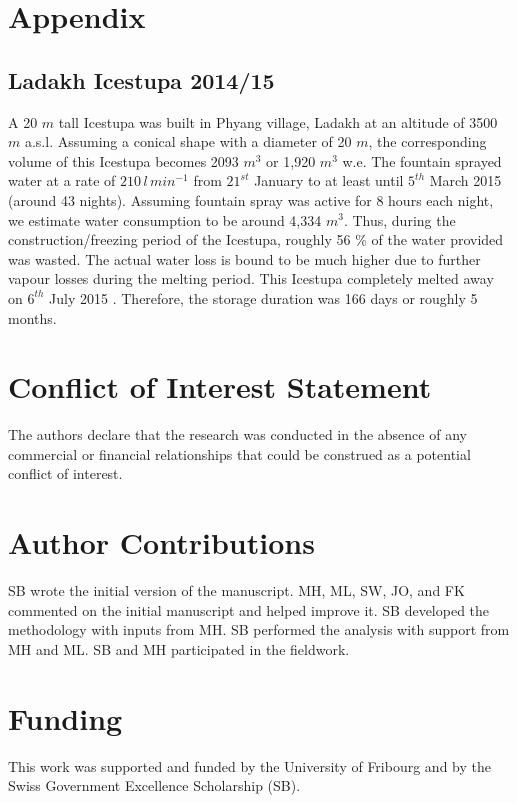 \documentclass[utf8]{frontiersSCNS} %
\begin{document}
\section{Appendix}

\subsection{Ladakh Icestupa 2014/15} \label{section:ladakhloss} A 20 $m$ tall Icestupa \citep{iceheight} was built in
Phyang village, Ladakh at an altitude of 3500 $m$ a.s.l. Assuming a conical shape with a diameter of 20 $m$, the
corresponding volume of this Icestupa becomes 2093 $m^3$ or 1,920 $m^3$ w.e. The fountain sprayed water at a rate
of $210\, l\,min^{-1}$ \citep{waterinput} from $21^{st}$ January \citep{waterstart} to at least until $5^{th}$ March
2015 \citep{waterend} (around 43 nights). Assuming fountain spray was active for 8 hours each night, we estimate water
consumption to be around 4,334 $m^3$. Thus, during the construction/freezing period of the Icestupa, roughly 56 \%
of the water provided was wasted. The actual water loss is bound to be much higher due to further vapour losses during
the melting period. This Icestupa completely melted away on $6^{th}$ July 2015 \citep{iceends}. Therefore, the storage
duration was 166 days or roughly 5 months. 


\section*{Conflict of Interest Statement} The authors declare that the research was conducted in the absence of any
commercial or financial relationships that could be construed as a potential conflict of interest.

\section*{Author Contributions} SB wrote the initial version of the manuscript. MH, ML, SW, JO, and FK commented on
the initial manuscript and helped improve it. SB developed the methodology with inputs from MH. SB performed the
analysis with support from MH and ML. SB and MH participated in the fieldwork.

\section*{Funding} This work was supported and funded by the University of Fribourg and by the Swiss Government
Excellence Scholarship (SB).
\end{document}
